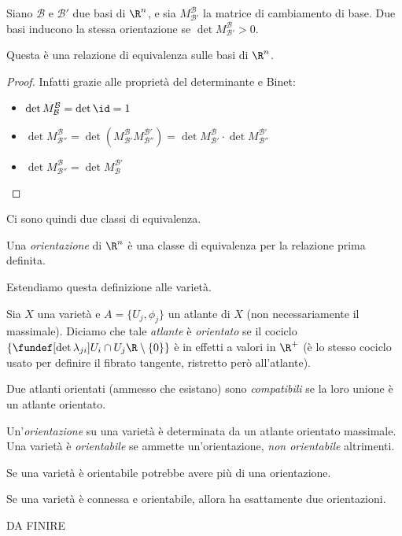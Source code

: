 
Siano $\mathcal{B}$ e $\mathcal{B'}$ due basi di $\R^n$, e sia $M^{\mathcal{B}}_{\mathcal{B'}}$ la matrice di cambiamento di base.
Due basi inducono la stessa orientazione se $\det M^{\mathcal{B}}_{\mathcal{B'}}>0$.

\begin{prop}
Questa è una relazione di equivalenza sulle basi di $\R^n$.
\end{prop}
\begin{proof}
Infatti grazie alle proprietà del determinante e Binet:
\begin{itemize}
\item $\det M^{\mathcal{B}}_{\mathcal{B}} = \det \id = 1$
\item $\det M^{\mathcal{B}}_{\mathcal{B''}} = \det ( M^{\mathcal{B}}_{\mathcal{B'}}  M^{\mathcal{B'}}_{\mathcal{B''}})= \det  M^{\mathcal{B}}_{\mathcal{B'}} \cdot \det  M^{\mathcal{B'}}_{\mathcal{B''}}$
\item $\det M^{\mathcal{B}}_{\mathcal{B''}} = \det  M^{\mathcal{B'}}_{\mathcal{B}}$
\qedhere
\end{itemize}
\end{proof}

\noindent Ci sono quindi due classi di equivalenza.

\begin{defn}[Orientazione]
Una \emph{orientazione} di $\R^n$ è una classe di equivalenza per la relazione prima definita.
\end{defn}

Estendiamo questa definizione alle varietà.

\begin{defn}
Sia $X$ una varietà e $A = \{U_j, \phi_j\}$ un atlante di $X$ (non necessariamente il massimale). Diciamo che tale \emph{atlante} è \emph{orientato} se il cociclo $\{\fundef[\det \lambda_{ji}]{U_i \cap U_j}{\R\setminus\{0\}}\}$ è in effetti a valori in $\R^+$ (è lo stesso cociclo usato per definire il fibrato tangente, ristretto però all'atlante).
\end{defn}

\begin{defn}
Due atlanti orientati (ammesso che esistano) sono \emph{compatibili} se la loro unione è un atlante orientato.
\end{defn}

\begin{defn}
Un'\emph{orientazione} su una varietà è determinata da un atlante orientato massimale. Una varietà è \emph{orientabile} se ammette un'orientazione, \emph{non orientabile} altrimenti.
\end{defn}

\begin{oss}
Se una varietà è orientabile potrebbe avere più di una orientazione.
\end{oss}

\begin{prop}
Se una varietà è connessa e orientabile, allora ha esattamente due orientazioni.
\end{prop}

DA FINIRE


